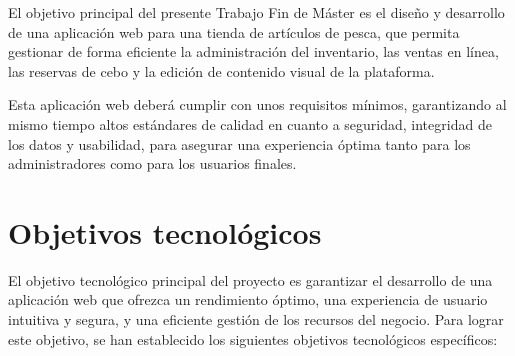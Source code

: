 El objetivo principal del presente Trabajo Fin de Máster es el diseño y desarrollo de una aplicación web para una tienda de artículos de pesca, que permita gestionar de forma eficiente la administración del inventario, las ventas en línea, las reservas de cebo y la edición de contenido visual de la plataforma.

\vspace{0.5cm}

Esta aplicación web deberá cumplir con unos requisitos mínimos, garantizando al mismo tiempo altos estándares de calidad en cuanto a seguridad, integridad de los datos y usabilidad, para asegurar una experiencia óptima tanto para los administradores como para los usuarios finales.


\section{Objetivos tecnológicos}\label{sec:sec2.1}

El objetivo tecnológico principal del proyecto es garantizar el desarrollo de una aplicación web que ofrezca un rendimiento óptimo, una experiencia de usuario intuitiva y segura, y una eficiente gestión de los recursos del negocio. Para lograr este objetivo, se han establecido los siguientes objetivos tecnológicos específicos:

